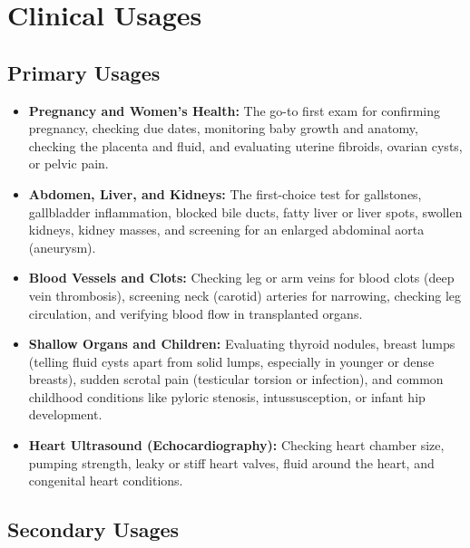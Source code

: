 \section{Clinical Usages}

\subsection{Primary Usages}

\begin{itemize}
    \item \textbf{Pregnancy and Women's Health:} The go-to first exam for confirming pregnancy, checking due dates, monitoring baby growth and anatomy, checking the placenta and fluid, and evaluating uterine fibroids, ovarian cysts, or pelvic pain.
    \item \textbf{Abdomen, Liver, and Kidneys:} The first-choice test for gallstones, gallbladder inflammation, blocked bile ducts, fatty liver or liver spots, swollen kidneys, kidney masses, and screening for an enlarged abdominal aorta (aneurysm).
    \item \textbf{Blood Vessels and Clots:} Checking leg or arm veins for blood clots (deep vein thrombosis), screening neck (carotid) arteries for narrowing, checking leg circulation, and verifying blood flow in transplanted organs.
    \item \textbf{Shallow Organs and Children:} Evaluating thyroid nodules, breast lumps (telling fluid cysts apart from solid lumps, especially in younger or dense breasts), sudden scrotal pain (testicular torsion or infection), and common childhood conditions like pyloric stenosis, intussusception, or infant hip development.
    \item \textbf{Heart Ultrasound (Echocardiography):} Checking heart chamber size, pumping strength, leaky or stiff heart valves, fluid around the heart, and congenital heart conditions.
\end{itemize}

\subsection{Secondary Usages}

